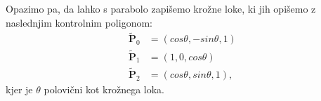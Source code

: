 \documentclass[a4paper,11pt]{article}
\theoremstyle{definition}
\theoremstyle{plain}
\begin{document}
\noindent
Opazimo pa, da lahko s parabolo zapišemo krožne loke, ki jih opišemo z naslednjim kontrolnim poligonom:
\begin{align*}
\boldsymbol{\tilde{P}}_0 &= (cos\theta, -sin\theta, 1)\\
\boldsymbol{\tilde{P}}_1 &= (1, 0, cos\theta)\\
\boldsymbol{\tilde{P}}_2 &= (cos\theta, sin\theta, 1),
\end{align*}
kjer je $\theta$ polovični kot krožnega loka. 

\end{document}
